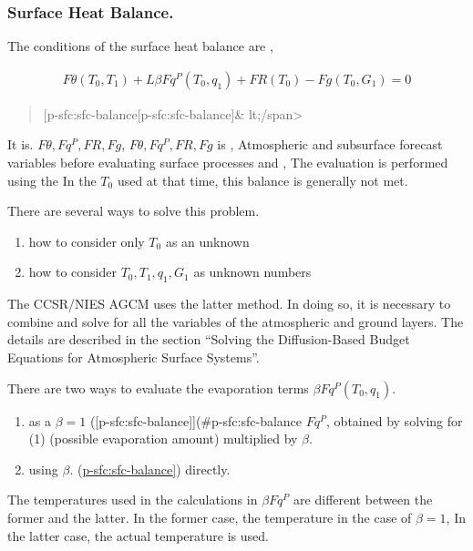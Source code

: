 \hypertarget{surface-heat-balance.}{%
\subsubsection{Surface Heat Balance.}\label{surface-heat-balance.}}

The conditions of the surface heat balance are ,

\begin{eqnarray}
   F\theta(T_0,T_1) + L \beta Fq^P(T_0,q_1) + FR(T_0) - Fg(T_0,G_1) = 0
\end{eqnarray}

\begin{quote}
{[}p-sfc:sfc-balance{[}p-sfc:sfc-balance{]}\& lt;/span\textgreater{}
\end{quote}

It is. \(F\theta, Fq^P, FR, Fg\), \(F\theta, Fq^P, FR, Fg\) is ,
Atmospheric and subsurface forecast variables before evaluating surface
processes and , The evaluation is performed using the In the \(T_0\)
used at that time, this balance is generally not met.

There are several ways to solve this problem.

\begin{enumerate}
\def\labelenumi{\arabic{enumi}.}
\item
  how to consider only \(T_0\) as an unknown
\item
  how to consider \(T_0,T_1,q_1,G_1\) as unknown numbers
\end{enumerate}

The CCSR/NIES AGCM uses the latter method. In doing so, it is necessary
to combine and solve for all the variables of the atmospheric and ground
layers. The details are described in the section ``Solving the
Diffusion-Based Budget Equations for Atmospheric Surface Systems''.

There are two ways to evaluate the evaporation terms
\(\beta Fq^P(T_0,q_1)\).

\begin{enumerate}
\def\labelenumi{\arabic{enumi}.}
\item
  as a \(\beta=1\) ({[}p-sfc:sfc-balance{]}{]}(\#p-sfc:sfc-balance
  \(Fq^P\), obtained by solving for (1) (possible evaporation amount)
  multiplied by \(\beta\).
\item
  using \(\beta\).
  (\protect\hyperlink{p-sfc:sfc-balance}{p-sfc:sfc-balance{]}})
  directly.
\end{enumerate}

The temperatures used in the calculations in \(\beta Fq^P\) are
different between the former and the latter. In the former case, the
temperature in the case of \(\beta=1\), In the latter case, the actual
temperature is used.

